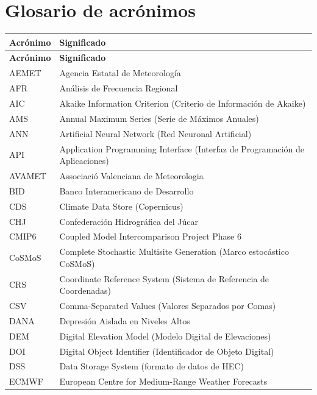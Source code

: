 \chapter*{Glosario de acrónimos}

\begin{longtable}{@{}>{\raggedright\arraybackslash}p{}>{\raggedright\arraybackslash}p{}@{}}
  \toprule
  \textbf{Acrónimo} & \textbf{Significado} \\
  \midrule
  \endfirsthead
  \toprule
  \textbf{Acrónimo} & \textbf{Significado} \\
  \midrule
  \endhead
  \bottomrule
  \endfoot
  \bottomrule
  \endlastfoot
  
  AEMET & Agencia Estatal de Meteorología \\
  AFR & Análisis de Frecuencia Regional \\
  AIC & Akaike Information Criterion (Criterio de Información de Akaike) \\
  AMS & Annual Maximum Series (Serie de Máximos Anuales) \\
  ANN & Artificial Neural Network (Red Neuronal Artificial) \\
  API & Application Programming Interface (Interfaz de Programación de Aplicaciones) \\
  AVAMET & Associació Valenciana de Meteorologia \\
  BID & Banco Interamericano de Desarrollo \\
  CDS & Climate Data Store (Copernicus) \\
  CHJ & Confederación Hidrográfica del Júcar \\
  CMIP6 & Coupled Model Intercomparison Project Phase 6 \\
  CoSMoS & Complete Stochastic Multisite Generation (Marco estocástico CoSMoS) \\
  CRS & Coordinate Reference System (Sistema de Referencia de Coordenadas) \\
  CSV & Comma-Separated Values (Valores Separados por Comas) \\
  DANA & Depresión Aislada en Niveles Altos \\
  DEM & Digital Elevation Model (Modelo Digital de Elevaciones) \\
  DOI & Digital Object Identifier (Identificador de Objeto Digital) \\
  DSS & Data Storage System (formato de datos de HEC) \\
  ECMWF & European Centre for Medium-Range Weather Forecasts \\

\end{longtable}
